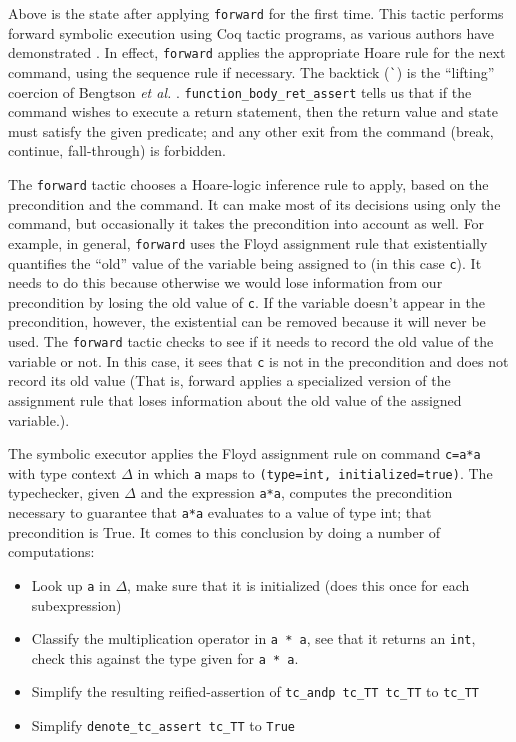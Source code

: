 \documentclass{puthesis}
\begin{document}
Above is the state after applying \lstinline|forward| for the first
time.  This tactic performs forward symbolic execution using Coq
tactic programs, as various authors have demonstrated
\cite{appel06:listmachine,chlipala11:pldi,bengtson12:Charge,mccreight09}. In
effect, \lstinline|forward| applies the appropriate Hoare rule for the
next command, using the sequence rule if necessary. The backtick
(\lstinline|`|) is the ``lifting'' coercion of Bengtson \emph{et al.}
\cite{bengtson12:Charge}.  \lstinline|function_body_ret_assert| tells
us that if the command wishes to execute a return statement, then the
return value and state must satisfy the given predicate; and any other
exit from the command (break, continue, fall-through) is forbidden.

The \lstinline|forward| tactic chooses a Hoare-logic inference rule to
apply, based on the precondition and the command. It can make most of
its decisions using only the command, but occasionally it takes the
precondition into account as well. For example, in general,
\lstinline|forward| uses the Floyd assignment rule that existentially
quantifies the ``old'' value of the variable being assigned to (in
this case \lstinline|c|). It needs to do this because otherwise we
would lose information from our precondition by losing the old value
of \lstinline|c|. If the variable doesn't appear in the precondition,
however, the existential can be removed because it will never be
used. The \lstinline|forward| tactic checks to see if it needs to
record the old value of the variable or not. In this case, it sees
that \lstinline|c| is not in the precondition and does not record its
old value (That is, forward applies a specialized version of the
assignment rule that loses information about the old value of the
assigned variable.).

The symbolic executor applies the Floyd assignment rule on command
\lstinline|c=a*a| with type context $\Delta$ in which \lstinline|a|
maps to \lstinline|(type=int, initialized=true)|.  The typechecker,
given $\Delta$ and the expression \lstinline|a*a|, computes the
precondition necessary to guarantee that \lstinline|a*a| evaluates to
a value of type int; that precondition is True. It comes to this
conclusion by doing a number of computations:

\begin{itemize}
\item Look up \lstinline|a| in $\Delta$, make sure that it is initialized
  (does this once for each subexpression)
\item Classify the multiplication operator in \lstinline|a * a|, see
  that it returns an \lstinline|int|, check this against the type
  given for \lstinline|a * a|.
\item Simplify the resulting reified-assertion of 
  \lstinline|tc_andp tc_TT tc_TT| to \lstinline|tc_TT|
\item Simplify \lstinline|denote_tc_assert tc_TT| to \lstinline|True|
\end{itemize}
\end{document}
